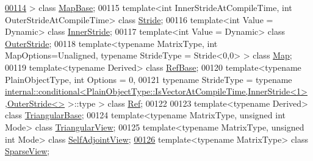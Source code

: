 \begin{DoxyCode}
\hyperlink{class_eigen_1_1_map_base}{00114} > \textcolor{keyword}{class }\hyperlink{class_eigen_1_1_map_base}{MapBase};
00115 \textcolor{keyword}{template}<\textcolor{keywordtype}{int} InnerStr\textcolor{keywordtype}{id}eAtCompileTime, \textcolor{keywordtype}{int} OuterStr\textcolor{keywordtype}{id}eAtCompileTime> \textcolor{keyword}{class }
      \hyperlink{group___core___module_class_eigen_1_1_stride}{Stride};
00116 \textcolor{keyword}{template}<\textcolor{keywordtype}{int} Value = Dynamic> \textcolor{keyword}{class }\hyperlink{class_eigen_1_1_inner_stride}{InnerStride};
00117 \textcolor{keyword}{template}<\textcolor{keywordtype}{int} Value = Dynamic> \textcolor{keyword}{class }\hyperlink{class_eigen_1_1_outer_stride}{OuterStride};
00118 \textcolor{keyword}{template}<\textcolor{keyword}{typename} MatrixType, \textcolor{keywordtype}{int} MapOptions=Unaligned, \textcolor{keyword}{typename} Str\textcolor{keywordtype}{id}eType = Str\textcolor{keywordtype}{id}e<0,0> > \textcolor{keyword}{class }
      \hyperlink{group___core___module_class_eigen_1_1_map}{Map};
00119 \textcolor{keyword}{template}<\textcolor{keyword}{typename} Derived> \textcolor{keyword}{class }\hyperlink{class_eigen_1_1_ref_base}{RefBase};
00120 \textcolor{keyword}{template}<\textcolor{keyword}{typename} PlainObjectType, \textcolor{keywordtype}{int} Options = 0,
00121          \textcolor{keyword}{typename} StrideType = \textcolor{keyword}{typename} 
      \hyperlink{struct_eigen_1_1internal_1_1conditional}{internal::conditional<PlainObjectType::IsVectorAtCompileTime,InnerStride<1>}
      ,\hyperlink{class_eigen_1_1_outer_stride}{OuterStride<>} >::type > \textcolor{keyword}{class }\hyperlink{group___core___module_class_eigen_1_1_ref}{Ref};
00122 
00123 \textcolor{keyword}{template}<\textcolor{keyword}{typename} Derived> \textcolor{keyword}{class }\hyperlink{group___core___module_class_eigen_1_1_triangular_base}{TriangularBase};
00124 \textcolor{keyword}{template}<\textcolor{keyword}{typename} MatrixType, \textcolor{keywordtype}{unsigned} \textcolor{keywordtype}{int} Mode> \textcolor{keyword}{class }\hyperlink{group___core___module_class_eigen_1_1_triangular_view}{TriangularView};
00125 \textcolor{keyword}{template}<\textcolor{keyword}{typename} MatrixType, \textcolor{keywordtype}{unsigned} \textcolor{keywordtype}{int} Mode> \textcolor{keyword}{class }\hyperlink{group___core___module_class_eigen_1_1_self_adjoint_view}{SelfAdjointView};
\hyperlink{group___sparse_core___module}{00126} \textcolor{keyword}{template}<\textcolor{keyword}{typename} MatrixType> \textcolor{keyword}{class }\hyperlink{group___sparse_core___module_class_eigen_1_1_sparse_view}{SparseView};

\end{DoxyCode}
